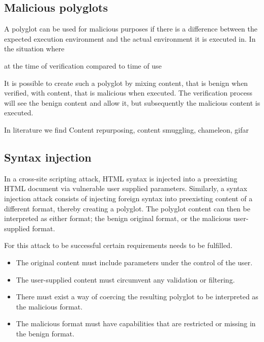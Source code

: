 \documentclass[10pt, conference, compsocconf]{IEEEtran}
\begin{document}
\subsection{Malicious polyglots}

A polyglot can be used for malicious purposes if there is a difference 
between the expected execution environment and the actual environment 
it is executed in.
In the situation where 

at the time of verification compared to time of use

It is possible to create such a polyglot by mixing content, that is benign 
when verified, with content, that is 
malicious when executed. The verification process will see the benign content 
and allow it, but subsequently the malicious content is executed.

In literature we find Content repurposing, content smuggling, chameleon, gifar

\subsection{Syntax injection}


In a cross-site scripting attack, HTML syntax is injected into a 
preexisting HTML document via vulnerable user supplied parameters. Similarly, 
a syntax injection attack consists of injecting foreign syntax into 
preexisting content of a different format, thereby creating a polyglot.
The polyglot content can then be interpreted as either format; the benign 
original format, or the malicious user-supplied format. 


For this attack to be successful certain requirements needs to be 
fulfilled. 
\begin{itemize}
	\item The original content must include parameters under the control of the 
				user.
	\item The user-supplied content must circumvent any validation or filtering.
	\item There must exist a way of coercing the resulting polyglot to be 
				interpreted as the malicious format.
	\item The malicious format must have capabilities that are restricted or 
				missing in the benign format.
\end{itemize}

\end{document}
